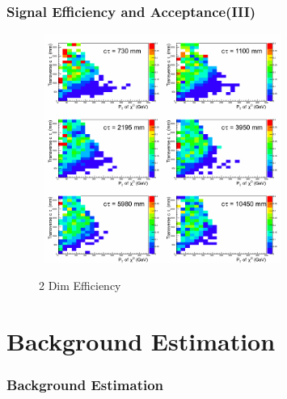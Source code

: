 \documentclass{beamer}
\begin{document}
\begin{frame}
\frametitle{Signal Efficiency and Acceptance(III)}
  \begin{figure}[ht]
   \begin{minipage}[b]{0.7\linewidth}
    \mbox{
  \centering
  \includegraphics[height=7.5cm, width=0.65\paperwidth]{THESISPLOTS/Eff180_xPt_ct.png} }
    \vspace{-0.5cm}
    \caption{2 Dim Efficiency}
  \end{minipage}
 \end{figure}
\end{frame}


\section{Background Estimation}
\begin{frame}
\frametitle{\Huge Background Estimation}
\end{frame}

\end{document}

